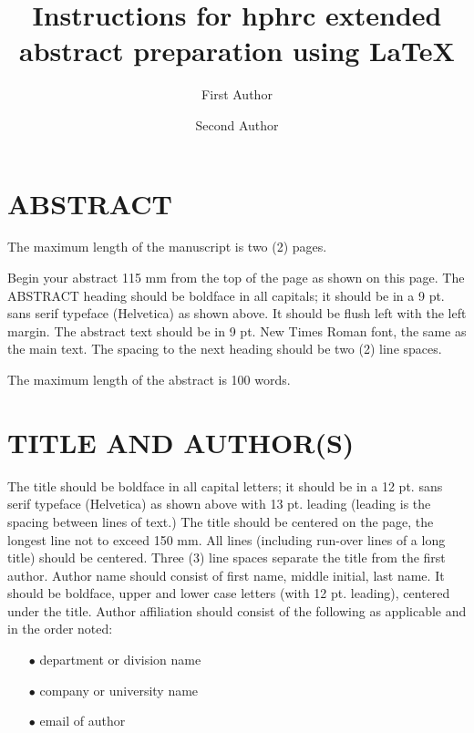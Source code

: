 \documentclass[twocolumn,10pt]{hphrc}
\title{Instructions for hphrc extended abstract preparation using \LaTeX}
\author{First Author
    \affiliation{
	Department of ...\\
	Organisation/University\\
    email
    }	
}
\author{Second Author
          \affiliation{Department of ...\\
	Organisation/University\\
	email
    }
}
\begin{document}
\maketitle   %

\fontsize{9}{11}\selectfont

\section*{ABSTRACT}

The maximum length of the manuscript is two (2) pages.

Begin your abstract 115 mm from the top of the page as shown on this page. The ABSTRACT heading should be boldface in all capitals; it should be in a 9 pt. sans serif typeface (Helvetica) as shown above. It should be flush left with the left margin. The abstract text should be in 9 pt. New Times Roman font, the same as the main text. The spacing to the next heading should be two (2) line spaces. 

The maximum length of the abstract is 100 words.

\section*{TITLE AND AUTHOR(S)}

The title should be boldface in all capital letters; it should be in a 12 pt. sans serif typeface (Helvetica) as shown above with 13 pt. leading (leading is the spacing between lines of text.) The title should be centered on the page, the longest line not to exceed 150 mm. All lines (including run-over lines of a long title) should be centered. Three (3) line spaces separate the title from the first author. Author name should consist of first name, middle initial, last name. It should be boldface, upper and lower case letters (with 12 pt. leading), centered under the title. Author affiliation should consist of the following as applicable and in the order noted:

\begin{itemize}
\item[$\bullet$] department or division name
\item[$\bullet$] company or university name
\item[$\bullet$] email of author
\end{itemize}
\end{document}
